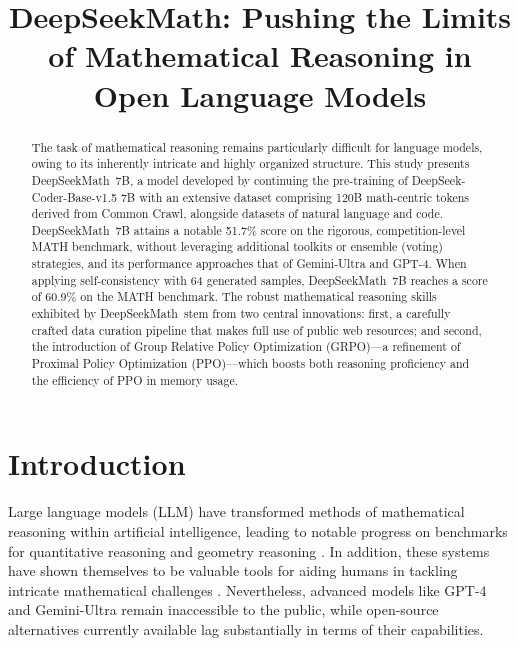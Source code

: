 \title{DeepSeekMath: Pushing the Limits of Mathematical Reasoning in Open Language Models}

\begin{abstract}
The task of mathematical reasoning remains particularly difficult for language models, owing to its inherently intricate and highly organized structure. This study presents DeepSeekMath~7B, a model developed by continuing the pre-training of DeepSeek-Coder-Base-v1.5 7B with an extensive dataset comprising 120B math-centric tokens derived from Common Crawl, alongside datasets of natural language and code. DeepSeekMath~7B attains a notable 51.7\% score on the rigorous, competition-level MATH benchmark, without leveraging additional toolkits or ensemble (voting) strategies, and its performance approaches that of Gemini-Ultra and GPT-4. When applying self-consistency with 64 generated samples, DeepSeekMath~7B reaches a score of 60.9\% on the MATH benchmark. The robust mathematical reasoning skills exhibited by DeepSeekMath~stem from two central innovations: first, a carefully crafted data curation pipeline that makes full use of public web resources; and second, the introduction of Group Relative Policy Optimization (GRPO)—a refinement of Proximal Policy Optimization (PPO)—which boosts both reasoning proficiency and the efficiency of PPO in memory usage.
\end{abstract}

\section{Introduction}

Large language models (LLM) have transformed methods of mathematical reasoning within artificial intelligence, leading to notable progress on benchmarks for quantitative reasoning \citep{MATH} and geometry reasoning \citep{trinh2024solving}. In addition, these systems have shown themselves to be valuable tools for aiding humans in tackling intricate mathematical challenges \citep{tao}. Nevertheless, advanced models like GPT-4 \citep{gpt4} and Gemini-Ultra \citep{gemini} remain inaccessible to the public, while open-source alternatives currently available lag substantially in terms of their capabilities.

